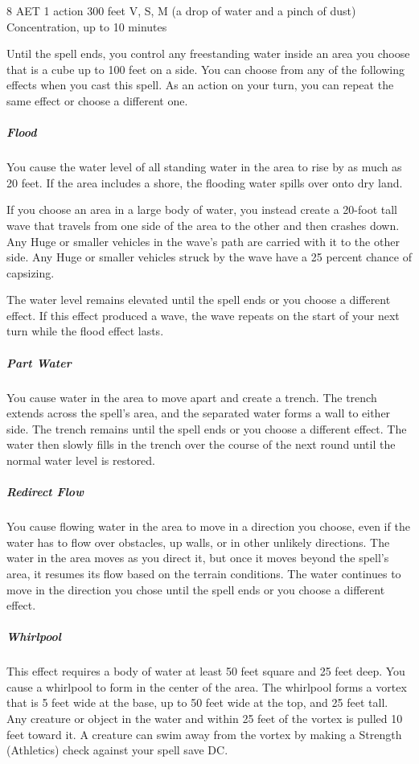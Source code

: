 {8 AET}
{1 action}
{300 feet}
{V, S, M (a drop of water and a pinch of dust)}
{Concentration, up to 10 minutes}

Until the spell ends, you control any freestanding water inside an area you choose that is a cube up to 100 feet on a side. You can choose from any of the following effects when you cast this spell. As an action on your turn, you can repeat the same effect or choose a different one.

\subparagraph*{Flood} You cause the water level of all standing water in the area to rise by as much as 20 feet. If the area includes a shore, the flooding water spills over onto dry land.

If you choose an area in a large body of water, you instead create a 20-foot tall wave that travels from one side of the area to the other and then crashes down. Any Huge or smaller vehicles in the wave's path are carried with it to the other side. Any Huge or smaller vehicles struck by the wave have a 25 percent chance of capsizing.

The water level remains elevated until the spell ends or you choose a different effect. If this effect produced a wave, the wave repeats on the start of your next turn while the flood effect lasts.

\subparagraph*{Part Water} You cause water in the area to move apart and create a trench. The trench extends across the spell's area, and the separated water forms a wall to either side. The trench remains until the spell ends or you choose a different effect. The water then slowly fills in the trench over the course of the next round until the normal water level is restored.

\subparagraph*{Redirect Flow} You cause flowing water in the area to move in a direction you choose, even if the water has to flow over obstacles, up walls, or in other unlikely directions. The water in the area moves as you direct it, but once it moves beyond the spell's area, it resumes its flow based on the terrain conditions. The water continues to move in the direction you chose until the spell ends or you choose a different effect.

\subparagraph*{Whirlpool} This effect requires a body of water at least 50 feet square and 25 feet deep. You cause a whirlpool to form in the center of the area. The whirlpool forms a vortex that is 5 feet wide at the base, up to 50 feet wide at the top, and 25 feet tall. Any creature or object in the water and within 25 feet of the vortex is pulled 10 feet toward it. A creature can swim away from the vortex by making a Strength (Athletics) check against your spell save DC.

